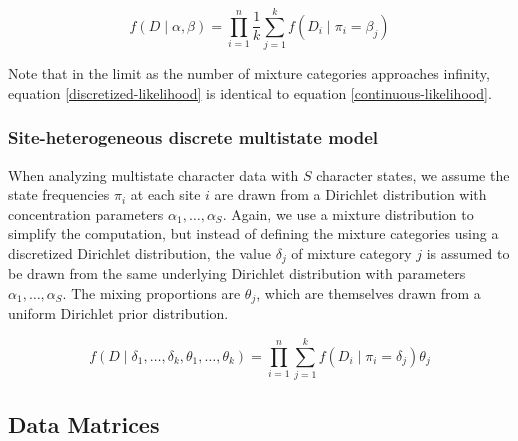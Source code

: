 \documentclass[]{article}
\begin{document}
\begin{equation}\label{discretized-likelihood}
f(D\mid \alpha,\beta) = \prod_{i=1}^n\frac{1}{k}\sum_{j=1}^k f(D_i \mid \pi_i = \beta_j)
\end{equation}

Note that in the limit as the number of mixture categories approaches infinity, equation \ref{discretized-likelihood} is identical to equation \ref{continuous-likelihood}.

\subsubsection{Site-heterogeneous discrete multistate model}

When analyzing multistate character data with $S$ character states, we assume the state frequencies $\pi_i$ at each site $i$ are drawn from a Dirichlet distribution with concentration parameters $\alpha_1,\ldots,\alpha_S$.
Again, we use a mixture distribution to simplify the computation, but instead of defining the mixture categories using a discretized Dirichlet distribution, the value $\delta_j$ of mixture category $j$ is assumed to be drawn from the same underlying Dirichlet distribution with parameters $\alpha_1,\ldots,\alpha_S$.
The mixing proportions are $\theta_j$, which are themselves drawn from a uniform Dirichlet prior distribution.

$$f(D\mid \delta_1,\ldots,\delta_k,\theta_1,\ldots,\theta_k) = \prod_{i=1}^n \sum_{j=1}^k  f(D_i \mid \pi_i = \delta_j)\theta_j$$

\subsection{Data Matrices}
\end{document}
